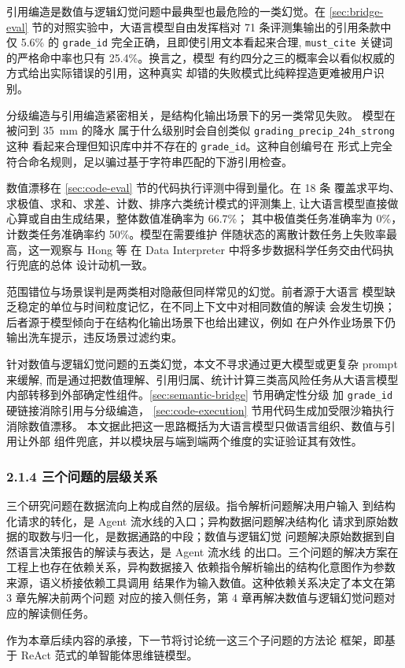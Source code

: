 引用编造是数值与逻辑幻觉问题中最典型也最危险的一类幻觉。在
\ref{sec:bridge-eval}
节的对照实验中，大语言模型自由发挥档对 71 条评测集输出的引用条款中
仅 5.6\% 的 \texttt{grade\_\bk{}id} 完全正确，且即使引用文本看起来合理,
\texttt{must\_\bk{}cite} 关键词的严格命中率也只有 25.4\%。换言之，模型
有约四分之三的概率会以看似权威的方式给出实际错误的引用，这种真实
却错的失败模式比纯粹捏造更难被用户识别。

分级编造与引用编造紧密相关，是结构化输出场景下的另一类常见失败。
模型在被问到 \SI{35}{mm} 的降水
属于什么级别时会自创类似 \texttt{grading\_\bk{}precip\_\bk{}24h\_\bk{}strong} 这种
看起来合理但知识库中并不存在的 \texttt{grade\_\bk{}id}。这种自创编号在
形式上完全符合命名规则，足以骗过基于字符串匹配的下游引用检查。

数值漂移在 \ref{sec:code-eval} 节的代码执行评测中得到量化。在 18 条
覆盖求平均、求极值、求和、求差、计数、排序六类统计模式的评测集上,
让大语言模型直接做心算或自由生成结果，整体数值准确率为 66.7\%；
其中极值类任务准确率为 0\%，计数类任务准确率约 50\%。模型在需要维护
伴随状态的离散计数任务上失败率最高，这一观察与 Hong 等 \cite{ref20}
在 Data Interpreter 中将多步数据科学任务交由代码执行兜底的总体
设计动机一致。

范围错位与场景误判是两类相对隐蔽但同样常见的幻觉。前者源于大语言
模型缺乏稳定的单位与时间粒度记忆，在不同上下文中对相同数值的解读
会发生切换；后者源于模型倾向于在结构化输出场景下也给出建议，例如
在户外作业场景下仍输出洗车提示，违反场景过滤约束。

针对数值与逻辑幻觉问题的五类幻觉，本文不寻求通过更大模型或更复杂
prompt 来缓解,
而是通过把数值理解、引用归属、统计计算三类高风险任务从大语言模型
内部转移到外部确定性组件。\ref{sec:semantic-bridge} 节用确定性分级
加 \texttt{grade\_\bk{}id} 硬链接消除引用与分级编造，
\ref{sec:code-execution} 节用代码生成加受限沙箱执行消除数值漂移。
本文据此把这一思路概括为大语言模型只做语言组织、数值与引用让外部
组件兜底，并以模块层与端到端两个维度的实证验证其有效性。

\subsubsection*{2.1.4 \quad 三个问题的层级关系}

三个研究问题在数据流向上构成自然的层级。指令解析问题解决用户输入
到结构化请求的转化，是 Agent 流水线的入口；异构数据问题解决结构化
请求到原始数据的取数与归一化，是数据通路的中段；数值与逻辑幻觉
问题解决原始数据到自然语言决策报告的解读与表达，是 Agent 流水线
的出口。三个问题的解决方案在工程上也存在依赖关系，异构数据接入
依赖指令解析输出的结构化意图作为参数来源，语义桥接依赖工具调用
结果作为输入数值。这种依赖关系决定了本文在第 3 章先解决前两个问题
对应的接入侧任务，第 4 章再解决数值与逻辑幻觉问题对应的解读侧任务。

作为本章后续内容的承接，下一节将讨论统一这三个子问题的方法论
框架，即基于 ReAct 范式的单智能体思维链模型。

